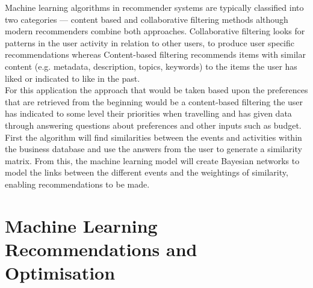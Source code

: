 Machine learning algorithms in recommender systems are typically classified into two categories — content based and collaborative filtering methods although modern recommenders combine both approaches. Collaborative filtering looks for patterns in the user activity in relation to other users, to produce user specific recommendations whereas Content-based filtering recommends items with similar content (e.g. metadata, description, topics, keywords) to the items the user has liked or indicated to like in the past. \\

For this application the approach that would be taken based upon the preferences that are retrieved from the beginning would be a content-based filtering the user has indicated to some level their priorities when travelling and has given data through answering questions about preferences and other inputs such as budget. First the algorithm will find similarities between the events and activities within the business database and use the answers from the user to generate a similarity matrix. From this, the machine learning model will create Bayesian networks to model the links between the different events and the weightings of similarity, enabling recommendations to be made.

\section{Machine Learning Recommendations and Optimisation}

